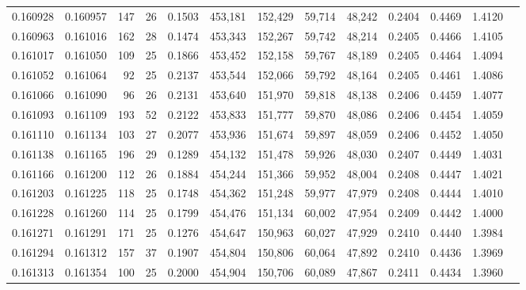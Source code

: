 \begin{tabular}{rrrrrrrrrrrrr}
0.160928 & 0.160957 &   147 &  26 &                                     0.1503 & 453,181 & 152,429 &  59,714 &  48,242 & 0.2404 & 0.4469 & 1.4120 \\
0.160963 & 0.161016 &   162 &  28 &                                     0.1474 & 453,343 & 152,267 &  59,742 &  48,214 & 0.2405 & 0.4466 & 1.4105 \\
0.161017 & 0.161050 &   109 &  25 &                                     0.1866 & 453,452 & 152,158 &  59,767 &  48,189 & 0.2405 & 0.4464 & 1.4094 \\
0.161052 & 0.161064 &    92 &  25 &                                     0.2137 & 453,544 & 152,066 &  59,792 &  48,164 & 0.2405 & 0.4461 & 1.4086 \\
0.161066 & 0.161090 &    96 &  26 &                                     0.2131 & 453,640 & 151,970 &  59,818 &  48,138 & 0.2406 & 0.4459 & 1.4077 \\
0.161093 & 0.161109 &   193 &  52 &                                     0.2122 & 453,833 & 151,777 &  59,870 &  48,086 & 0.2406 & 0.4454 & 1.4059 \\
0.161110 & 0.161134 &   103 &  27 &                                     0.2077 & 453,936 & 151,674 &  59,897 &  48,059 & 0.2406 & 0.4452 & 1.4050 \\
0.161138 & 0.161165 &   196 &  29 &                                     0.1289 & 454,132 & 151,478 &  59,926 &  48,030 & 0.2407 & 0.4449 & 1.4031 \\
0.161166 & 0.161200 &   112 &  26 &                                     0.1884 & 454,244 & 151,366 &  59,952 &  48,004 & 0.2408 & 0.4447 & 1.4021 \\
0.161203 & 0.161225 &   118 &  25 &                                     0.1748 & 454,362 & 151,248 &  59,977 &  47,979 & 0.2408 & 0.4444 & 1.4010 \\
0.161228 & 0.161260 &   114 &  25 &                                     0.1799 & 454,476 & 151,134 &  60,002 &  47,954 & 0.2409 & 0.4442 & 1.4000 \\
0.161271 & 0.161291 &   171 &  25 &                                     0.1276 & 454,647 & 150,963 &  60,027 &  47,929 & 0.2410 & 0.4440 & 1.3984 \\
0.161294 & 0.161312 &   157 &  37 &                                     0.1907 & 454,804 & 150,806 &  60,064 &  47,892 & 0.2410 & 0.4436 & 1.3969 \\
0.161313 & 0.161354 &   100 &  25 &                                     0.2000 & 454,904 & 150,706 &  60,089 &  47,867 & 0.2411 & 0.4434 & 1.3960 \\

\end{tabular}
